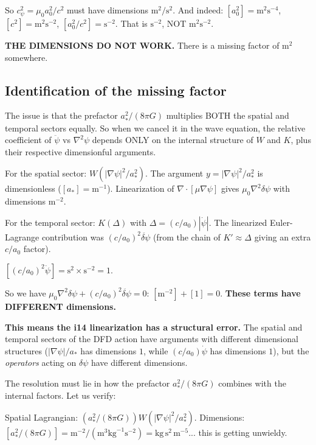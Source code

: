 \documentclass[11pt]{article}
\begin{document}
So $c_\psi^2 = \mu_0 a_0^2/c^2$ must have dimensions $\text{m}^2/\text{s}^2$.
And indeed: $[a_0^2] = \text{m}^2\text{s}^{-4}$, $[c^2] = \text{m}^2\text{s}^{-2}$,
$[a_0^2/c^2] = \text{s}^{-2}$. That is $\text{s}^{-2}$, NOT $\text{m}^2\text{s}^{-2}$.

\textbf{THE DIMENSIONS DO NOT WORK.} There is a missing factor of
$\text{m}^2$ somewhere.

\subsection{Identification of the missing factor}

The issue is that the prefactor $a_*^2/(8\pi G)$ multiplies BOTH the
spatial and temporal sectors equally. So when we cancel it in the wave
equation, the relative coefficient of $\ddot\psi$ vs $\nabla^2\psi$
depends ONLY on the internal structure of $W$ and $K$, plus their
respective dimensionful arguments.

For the spatial sector: $W(|\nabla\psi|^2/a_*^2)$. The argument
$y = |\nabla\psi|^2/a_*^2$ is dimensionless ($[a_*] = \text{m}^{-1}$).
Linearization of $\nabla\cdot[\mu\nabla\psi]$ gives $\mu_0\nabla^2\delta\psi$
with dimensions $\text{m}^{-2}$.

For the temporal sector: $K(\Delta)$ with $\Delta = (c/a_0)|\dot\psi|$.
The linearized Euler-Lagrange contribution was $(c/a_0)^2\ddot{\delta\psi}$
(from the chain of $K' \approx \Delta$ giving an extra $c/a_0$ factor).

$[(c/a_0)^2\ddot\psi] = \text{s}^2 \times \text{s}^{-2} = 1$.

So we have $\mu_0\nabla^2\delta\psi + (c/a_0)^2\ddot{\delta\psi} = 0$:
$[\text{m}^{-2}] + [1] = 0$. \textbf{These terms have DIFFERENT dimensions.}

\textbf{This means the i14 linearization has a structural error.} The
spatial and temporal sectors of the DFD action have arguments with
different dimensional structures ($|\nabla\psi|/a_*$ has dimensions
$1$, while $(c/a_0)\dot\psi$ has dimensions $1$), but the
\emph{operators} acting on $\delta\psi$ have different dimensions.

The resolution must lie in how the prefactor $a_*^2/(8\pi G)$ combines
with the internal factors. Let us verify:

Spatial Lagrangian: $(a_*^2/(8\pi G)) W(|\nabla\psi|^2/a_*^2)$.
Dimensions: $[a_*^2/(8\pi G)] = \text{m}^{-2}/(\text{m}^3\text{kg}^{-1}\text{s}^{-2})
= \text{kg}\,\text{s}^2\,\text{m}^{-5}$... this is getting unwieldy.
\end{document}
